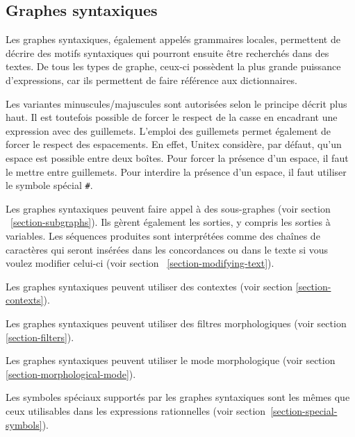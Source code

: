 \subsection{Graphes syntaxiques}
Les graphes syntaxiques, également appelés grammaires locales, permettent de décrire
des motifs syntaxiques qui pourront ensuite être recherchés dans des textes. De tous les
types de graphe, ceux-ci possèdent la plus grande puissance d’expressions, car ils permettent
de faire référence aux dictionnaires.

\bigskip
\noindent Les variantes minuscules/majuscules sont autorisées selon le principe décrit plus haut.
Il est toutefois possible de forcer le respect de la casse en encadrant une expression avec des
guillemets. L’emploi des guillemets permet également de forcer le respect des espacements.
En effet, Unitex considère, par défaut, qu’un espace est possible entre deux boîtes. Pour forcer
la présence d’un espace, il faut le mettre entre guillemets. Pour interdire la présence d’un
espace, il faut utiliser le symbole spécial \verb+#+.\index{\verb+#+}

\bigskip
\noindent Les graphes syntaxiques peuvent faire appel à des sous-graphes (voir section
~\ref{section-subgraphs}). Ils gèrent également les sorties, y compris les sorties à variables.
Les séquences produites sont interprétées comme des chaînes de caractères qui seront insérées
dans les concordances ou dans le texte si vous voulez modifier celui-ci (voir section
~\ref{section-modifying-text}).

\bigskip
\noindent Les graphes syntaxiques peuvent utiliser des contextes (voir section
\ref{section-contexts}).

\bigskip
\noindent Les graphes syntaxiques peuvent utiliser des filtres morphologiques (voir section
\ref{section-filters}).

\bigskip
\noindent Les graphes syntaxiques peuvent utiliser le mode morphologique (voir section
\ref{section-morphological-mode}).

\bigskip
\noindent Les symboles spéciaux supportés par les graphes syntaxiques sont les mêmes que ceux
utilisables dans les expressions rationnelles (voir section~\ref{section-special-symbols}).

